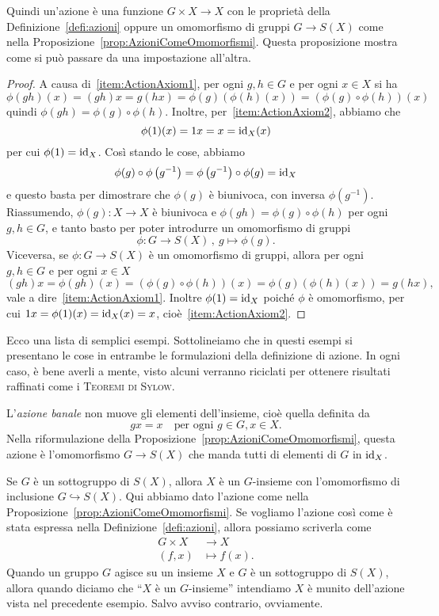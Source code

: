 Quindi un'azione è una funzione $G \times X \to X$ con le proprietà della Definizione~\ref{defi:azioni} oppure un omomorfismo di gruppi $G \to S(X)$ come nella Proposizione~\ref{prop:AzioniComeOmomorfismi}. Questa proposizione mostra come si può passare da una impostazione all'altra.

\begin{proof}
A causa di~\ref{item:ActionAxiom1}, per ogni $g,h\in G$ e per ogni $x\in X$ si ha
\[\phi(gh)(x)=(gh)x=g(hx)=\phi(g)(\phi(h)(x))=(\phi(g)\circ\phi(h))(x) \]
quindi $\phi(gh)=\phi(g) \circ \phi(h)$. Inoltre, per~\ref{item:ActionAxiom2}, abbiamo che 
\[\phi(1)(x)=1x=x=\mathrm{id}_X(x)\]
per cui $\phi(1)=\mathrm{id}_X$. Così stando le cose, abbiamo
\[\phi(g) \circ \phi\left(g^{-1}\right) = \phi\left(g^{-1}\right) \circ \phi(g) = \mathrm{id}_X \]
e questo basta per dimostrare che $\phi(g)$ è biunivoca, con inversa $\phi\left(g^{-1}\right)$. Riassumendo, $\phi(g) : X \to X$ è biunivoca e $\phi(gh) = \phi(g) \circ \phi(h)$ per ogni $g, h \in G$, e tanto basto per poter introdurre un omomorfismo di gruppi
\[\phi : G \to S(X) \,,\ g \mapsto \phi(g) .\]
Viceversa, se $\phi : G \to S(X)$ è un omomorfismo di gruppi, allora per ogni $g,h \in G$ e per ogni $x \in X$
\[
(gh)x=\phi(gh)(x)=(\phi(g) \circ \phi(h))(x)=\phi(g)(\phi(h)(x))=g(hx),
\]
vale a dire~\ref{item:ActionAxiom1}. Inoltre $\phi(1)=\mathrm{id}_X$ poiché $\phi$ è omomorfismo, per cui $1x=\phi(1)(x)=\mathrm{id}_X(x)=x$, cioè~\ref{item:ActionAxiom2}.
\end{proof}

Ecco una lista di semplici esempi. Sottolineiamo che in questi esempi si presentano le cose in entrambe le formulazioni della definizione di azione. In ogni caso, è bene averli a mente, visto alcuni verranno riciclati per ottenere risultati raffinati come i {\scshape Teoremi di Sylow}.

\begin{esem}
L'{\em azione banale} non muove gli elementi dell'insieme, cioè quella definita da
\[
gx=x \quad\text{per ogni } g\in G, x\in X .
\]
Nella riformulazione della Proposizione~\ref{prop:AzioniComeOmomorfismi}, questa azione è l'omomorfismo $G \to S(X)$ che manda tutti di elementi di $G$ in $\mathrm{id}_X$.
\end{esem}

\begin{esem}\label{esem:AzioneDiApplicazione} 
Se $G$ è un sottogruppo di $S(X)$, allora $X$ è un $G$-insieme con l'omomorfismo di inclusione $G \hookrightarrow S(X)$. Qui abbiamo dato l'azione come nella Proposizione~\ref{prop:AzioniComeOmomorfismi}. Se vogliamo l'azione così come è stata espressa nella Definizione~\ref{defi:azioni}, allora possiamo scriverla come
\[
\begin{aligned}
G \times X &\to X \\ 
(f, x) &\mapsto f(x) .
\end{aligned}
\]
Quando un gruppo $G$ agisce su un insieme $X$ e $G$ è un sottogruppo di $S(X)$, allora  quando diciamo che \enquote{$X$ è un $G$-insieme} intendiamo $X$ è munito dell'azione vista nel precedente esempio. Salvo avviso contrario, ovviamente.
\end{esem}

